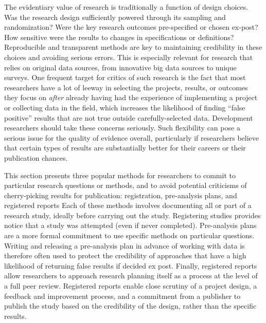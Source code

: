 The evidentiary value of research is traditionally a function of design choices.\cite{angrist2010credibility,ioannidis2005most}
Was the research design sufficiently powered through its sampling and randomization?
Were the key research outcomes pre-specified or chosen ex-post?
How sensitive were the results to changes in specifications or definitions?
Reproducible and transparent methods are key to maintaining credibility
in these choices and avoiding serious errors.\cite{christensen2019transparent}
This is especially relevant for research that relies on original data sources,
from innovative big data sources to unique surveys.
One frequent target for critics of such research\cite{ioannidis2017power}
is the fact that most researchers have a lot of leeway
in selecting the projects, results, or outcomes they focus on
\textit{after} already having had the experience of implementing a project
or collecting data in the field,
which increases the likelihood of finding ``false positive''
results that are not true outside carefully-selected data.
Development researchers should take these concerns seriously.
Such flexibility can pose a serious issue for the quality of evidence overall,
particularly if researchers believe that certain types of results
are substantially better for their careers or their publication chances.

This section presents three popular methods
for researchers to commit to particular research questions or methods,
and to avoid potential criticisms of cherry-picking results for publication: 
registration, pre-analysis plans, and registered reports
Each of these methods involves documenting all or part of a research study,
ideally before carrying out the study.
Registering studies provides notice that a study was attempted (even if never completed).
Pre-analysis plans are a more formal commitment
to use specific methods on particular questions.
Writing and releasing a pre-analysis plan
in advance of working with data is therefore often used to protect the credibility
of approaches that have a high likelihood of returning false results if decided ex post.
Finally, registered reports allow researchers to approach research planning itself
as a process at the level of a full peer review.
Registered reports enable close scrutiny of a project design,
a feedback and improvement process,
and a commitment from a publisher to publish the study 
based on the credibility of the design, rather than the specific results.

